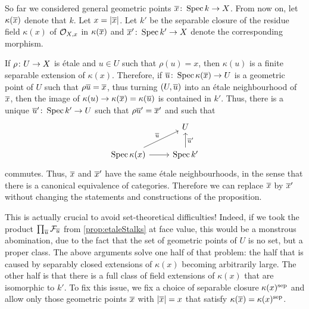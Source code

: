\begin{rem}\label{rem:setTheory}
	So far we considered general geometric points $\ov{x}\colon \Spec k\morphism X$. From now on, let $\kappa(\ov{x})$ denote that $k$. Let $x=|\ov{x}|$. Let $k'$ be the separable closure of the residue field $\kappa(x)$ of $\mathcal{O}_{X,x}$ in $\kappa(\ov{x})$ and $\ov{x}'\colon \Spec k'\morphism X$ denote the corresponding morphism.
	
	If $\rho\colon U\morphism X$ is étale and $u\in U$ such that $\rho(u)=x$, then $\kappa(u)$ is a finite separable extension of $\kappa(x)$. Therefore, if $\ov{u}\colon \Spec \kappa(\ov{x})\morphism U$ is a geometric point of $U$ such that $\rho \ov{u}=\ov{x}$, thus turning $(U,\ov{u})$ into an étale neighbourhood of $\ov{x}$, then the image of $\kappa(u)\morphism \kappa(\ov{x})=\kappa(\ov{u})$ is contained in $k'$. Thus, there is a unique $\ov{u}'\colon \Spec k'\morphism U$ such that $\rho \ov{u}'=\ov{x}'$ and such that
	\begin{equation*}
		\begin{tikzcd}
			& U\\
			\Spec \kappa(x)\rar\urar["\ov{u}"] & \Spec k'\uar["\ov{u}'"{swap}]
		\end{tikzcd}
	\end{equation*}
	commutes. Thus, $\ov{x}$ and $\ov{x}'$ have the same étale neighbourhoods, in the sense that there is a canonical equivalence of categories. Therefore we can replace $\ov{x}$ by $\ov{x}'$ without changing the statements and constructions of the proposition.
	
	This is actually crucial to avoid set-theoretical difficulties! Indeed, if we took the product $\prod_{\ov{u}}\Ff_{\ov{u}}$ from \cref{prop:etaleStalks} at face value, this would be a monstrous abomination, due to the fact that the set of geometric points of $U$ is no set, but a proper class. The above arguments solve one half of that problem: the half that is caused by separably closed extensions of $\kappa(x)$ becoming arbitrarily large. The other half is that there is a full class of field extensions of $\kappa(x)$ that are isomorphic to $k'$. To fix this issue, we fix a choice of separable closure $\kappa(x)^{\mathrm{sep}}$ and allow only those geometric points $\ov{x}$ with $|\ov{x}|=x$ that satisfy $\kappa(\ov{x})=\kappa(x)^\sep$.
\end{rem}
